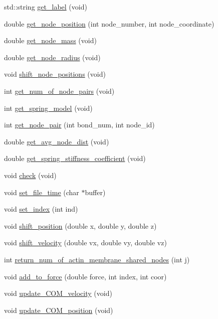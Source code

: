 \begin{DoxyCompactItemize}
std\+::string \mbox{\hyperlink{classActin_aebeb549997f6d414aee3d1661363877e}{get\+\_\+label}} (void)
\item 
double \mbox{\hyperlink{classActin_a833dc614b33e4196ce9202f10e556e36}{get\+\_\+node\+\_\+position}} (int node\+\_\+number, int node\+\_\+coordinate)
\item 
double \mbox{\hyperlink{classActin_a012b67bcc55e02a460dbd4d4b6cd8ea7}{get\+\_\+node\+\_\+mass}} (void)
\item 
double \mbox{\hyperlink{classActin_a4180755ec60e5d39f7399f80270bed1d}{get\+\_\+node\+\_\+radius}} (void)
\item 
void \mbox{\hyperlink{classActin_a87b0ca52480019247fa0075259619458}{shift\+\_\+node\+\_\+positions}} (void)
\item 
int \mbox{\hyperlink{classActin_aab2351fd842efa6127dda490cb1cdbd3}{get\+\_\+num\+\_\+of\+\_\+node\+\_\+pairs}} (void)
\item 
int \mbox{\hyperlink{classActin_adb7a38c592a496135519c58664752ec9}{get\+\_\+spring\+\_\+model}} (void)
\item 
int \mbox{\hyperlink{classActin_abd9b6ba0cc9f5aa8e670c314ae8afa8e}{get\+\_\+node\+\_\+pair}} (int bond\+\_\+num, int node\+\_\+id)
\item 
double \mbox{\hyperlink{classActin_ac003b972790cb2209bacabe7106ecdcb}{get\+\_\+avg\+\_\+node\+\_\+dist}} (void)
\item 
double \mbox{\hyperlink{classActin_abdb4d9b0af05a00dd532e546a69c1371}{get\+\_\+spring\+\_\+stiffness\+\_\+coefficient}} (void)
\item 
void \mbox{\hyperlink{classActin_abb02feefaf5bfccbcee6cd1637f3c742}{check}} (void)
\item 
void \mbox{\hyperlink{classActin_ae38649ca8146edc88562229715a1a4b6}{set\+\_\+file\+\_\+time}} (char $\ast$buffer)
\item 
void \mbox{\hyperlink{classActin_a507b129521e48ef9aa5b47398e5d1213}{set\+\_\+index}} (int ind)
\item 
void \mbox{\hyperlink{classActin_abc3996bfa64fb278823dc4e85c4ec9a4}{shift\+\_\+position}} (double x, double y, double z)
\item 
void \mbox{\hyperlink{classActin_ad98f0f42b66ec4d8b5fefb2ecec47a60}{shift\+\_\+velocity}} (double vx, double vy, double vz)
\item 
int \mbox{\hyperlink{classActin_ad6b6cfbc32c772aa024eafa5caea16ab}{return\+\_\+num\+\_\+of\+\_\+actin\+\_\+membrane\+\_\+shared\+\_\+nodes}} (int j)
\item 
void \mbox{\hyperlink{classActin_afb396a5e38dede5d41066f6f1c5893ed}{add\+\_\+to\+\_\+force}} (double force, int index, int coor)
\item 
void \mbox{\hyperlink{classActin_a2f171e0eab1ee13c538ca25c8cf69aa9}{update\+\_\+\+C\+O\+M\+\_\+velocity}} (void)
\item 
void \mbox{\hyperlink{classActin_a501f81fc7093ff06593c5549afd1167b}{update\+\_\+\+C\+O\+M\+\_\+position}} (void)
\end{DoxyCompactItemize}
